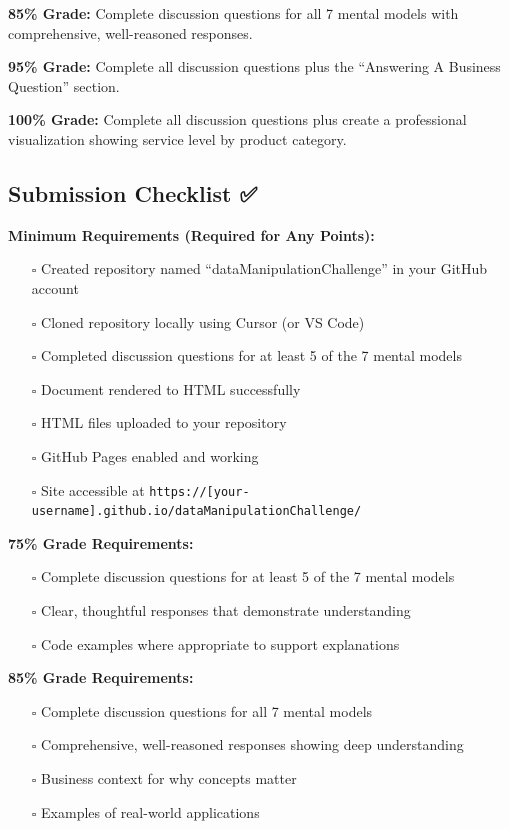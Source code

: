 \documentclass[
  letterpaper,
  DIV=11,
  numbers=noendperiod]{scrartcl}
\providecommand{\tightlist}{%
  \setlength{\itemsep}{0pt}\setlength{\parskip}{0pt}}
\begin{document}
\textbf{85\% Grade:} Complete discussion questions for all 7 mental
models with comprehensive, well-reasoned responses.

\textbf{95\% Grade:} Complete all discussion questions plus the
``Answering A Business Question'' section.

\textbf{100\% Grade:} Complete all discussion questions plus create a
professional visualization showing service level by product category.

\subsection{Submission Checklist ✅}\label{submission-checklist}

\textbf{Minimum Requirements (Required for Any Points):}

\begin{itemize}
\tightlist
\item[$\square$]
  Created repository named ``dataManipulationChallenge'' in your GitHub
  account
\item[$\square$]
  Cloned repository locally using Cursor (or VS Code)
\item[$\square$]
  Completed discussion questions for at least 5 of the 7 mental models
\item[$\square$]
  Document rendered to HTML successfully
\item[$\square$]
  HTML files uploaded to your repository
\item[$\square$]
  GitHub Pages enabled and working
\item[$\square$]
  Site accessible at
  \texttt{https://{[}your-username{]}.github.io/dataManipulationChallenge/}
\end{itemize}

\textbf{75\% Grade Requirements:}

\begin{itemize}
\tightlist
\item[$\square$]
  Complete discussion questions for at least 5 of the 7 mental models
\item[$\square$]
  Clear, thoughtful responses that demonstrate understanding
\item[$\square$]
  Code examples where appropriate to support explanations
\end{itemize}

\textbf{85\% Grade Requirements:}

\begin{itemize}
\tightlist
\item[$\square$]
  Complete discussion questions for all 7 mental models
\item[$\square$]
  Comprehensive, well-reasoned responses showing deep understanding
\item[$\square$]
  Business context for why concepts matter
\item[$\square$]
  Examples of real-world applications
\end{itemize}
\end{document}
